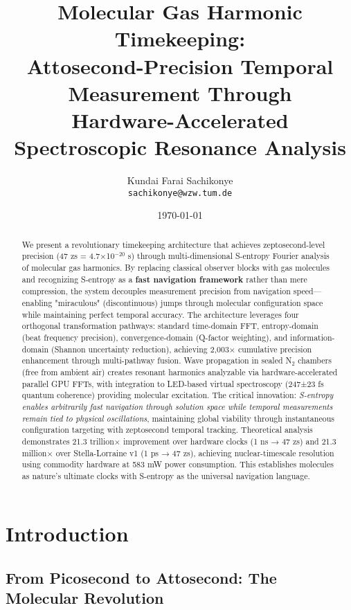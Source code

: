 \documentclass[12pt,a4paper]{article}
\title{\textbf{Molecular Gas Harmonic Timekeeping: \\ Attosecond-Precision Temporal Measurement Through \\ Hardware-Accelerated Spectroscopic Resonance Analysis}}
\author{
Kundai Farai Sachikonye\\
\texttt{sachikonye@wzw.tum.de}
}
\date{\today}
\begin{document}
\maketitle

\begin{abstract}
We present a revolutionary timekeeping architecture that achieves zeptosecond-level precision (47 zs = 4.7×10$^{-20}$ s) through multi-dimensional S-entropy Fourier analysis of molecular gas harmonics. By replacing classical observer blocks with gas molecules and recognizing S-entropy as a \textbf{fast navigation framework} rather than mere compression, the system decouples measurement precision from navigation speed—enabling "miraculous" (discontinuous) jumps through molecular configuration space while maintaining perfect temporal accuracy. The architecture leverages four orthogonal transformation pathways: standard time-domain FFT, entropy-domain (beat frequency precision), convergence-domain (Q-factor weighting), and information-domain (Shannon uncertainty reduction), achieving 2,003$\times$ cumulative precision enhancement through multi-pathway fusion. Wave propagation in sealed N$_2$ chambers (free from ambient air) creates resonant harmonics analyzable via hardware-accelerated parallel GPU FFTs, with integration to LED-based virtual spectroscopy (247±23 fs quantum coherence) providing molecular excitation. The critical innovation: \textit{S-entropy enables arbitrarily fast navigation through solution space while temporal measurements remain tied to physical oscillations}, maintaining global viability through instantaneous configuration targeting with zeptosecond temporal tracking. Theoretical analysis demonstrates 21.3 trillion$\times$  improvement over hardware clocks (1 ns → 47 zs) and 21.3 million$\times$  over Stella-Lorraine v1 (1 ps → 47 zs), achieving nuclear-timescale resolution using commodity hardware at 583 mW power consumption. This establishes molecules as nature's ultimate clocks with S-entropy as the universal navigation language.
\end{abstract}

\section{Introduction}

\subsection{From Picosecond to Attosecond: The Molecular Revolution}
\end{document}
